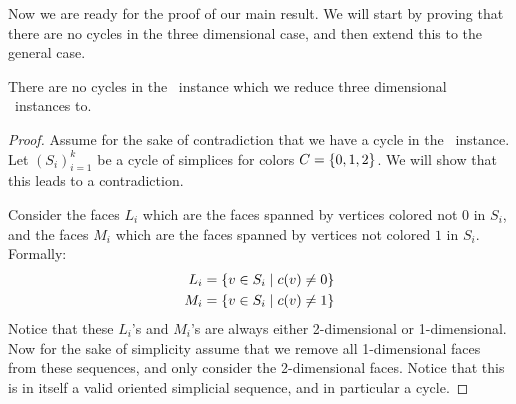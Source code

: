 Now we are ready for the proof of our main result. We will start by proving that there are no cycles in the three dimensional case, and then extend this to the general case.

\begin{theorem}
	\label{thm:no_cycles_in_three_dimensional_tarskistar}
	There are no cycles in the \EndOfLine\ instance which we reduce three dimensional \Tarskistar\ instances to.
\end{theorem}
\begin{proof}
	Assume for the sake of contradiction that we have a cycle in the \EndOfLine\ instance. Let $\left(S_i\right)_{i=1}^k$ be a cycle of simplices for colors $C = \left\{0, 1, 2\right\}$. We will show that this leads to a contradiction. \par

	Consider the faces $L_i$ which are the faces spanned by vertices colored not $0$ in $S_i$, and the faces $M_i$ which are the faces spanned by vertices not colored $1$ in $S_i$. Formally:
	\begin{align*}
		L_i & = \left\{v \in S_i \mid c(v) \neq 0\right\} \\
		M_i & = \left\{v \in S_i \mid c(v) \neq 1\right\}
	\end{align*}
	Notice that these $L_i$'s and $M_i$'s are always either 2-dimensional or 1-dimensional. Now for the sake of simplicity assume that we remove all 1-dimensional faces from these sequences, and only consider the 2-dimensional faces. Notice that this is in itself a valid oriented simplicial sequence, and in particular a cycle. \par


\end{proof}
